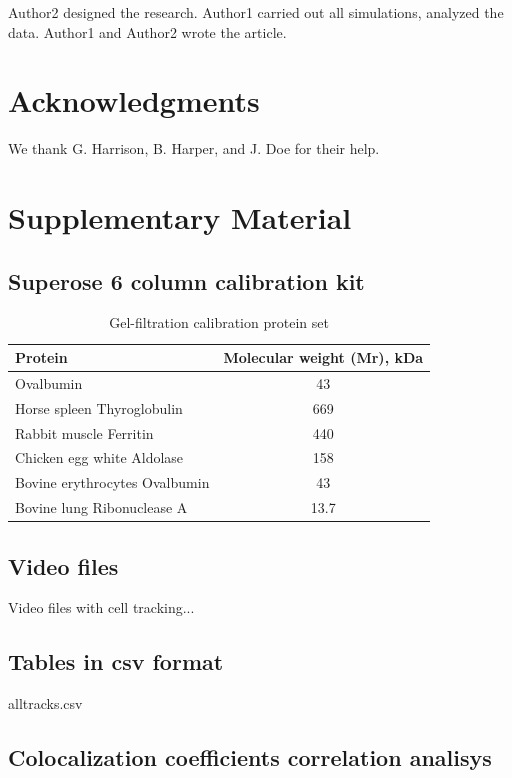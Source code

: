 \documentclass[english,authoryear]{elsarticle}
\begin{document}
Author2 designed the research. Author1 carried out all simulations, analyzed the data. Author1 and Author2 wrote the article.

\section*{Acknowledgments}

We thank G. Harrison, B. Harper, and J. Doe for their help.

%
%
%


\section*{Supplementary Material}

\subsection{Superose 6 column calibration kit}

\begin{table}[h]
  \caption{Gel-filtration calibration protein set}
  \label{calibration}
\centering
\begin{tabular}{l|c|}
 Protein & Molecular weight (Mr), kDa  \\
 \hline
 Ovalbumin & 43 \\
 Horse spleen Thyroglobulin & 669 \\
 Rabbit muscle Ferritin & 440 \\
 Chicken egg white Aldolase & 158 \\
 Bovine erythrocytes Ovalbumin & 43 \\
 Bovine lung Ribonuclease A & 13.7
\end{tabular}
\end{table}

\subsection*{Video files}

Video files with cell tracking...

\subsection*{Tables in csv format}

alltracks.csv

\subsection*{Colocalization coefficients correlation analisys}
\end{document}
